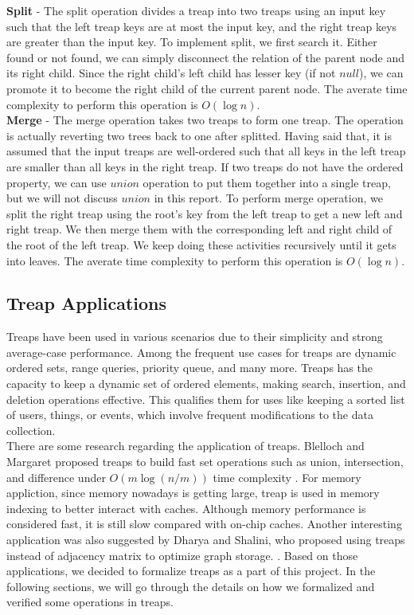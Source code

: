 \noindent \textbf{Split} - The split operation divides a treap into two treaps using an input key such that the left treap keys are at most the input key, and the right treap keys are greater than the input key. To implement split, we first search it. Either found or not found, we can simply disconnect the relation of the parent node and its right child. Since the right child's left child has lesser key (if not $null$), we can promote it to become the right child of the current parent node. The averate time complexity to perform this operation is $O(\log n)$.\\

\noindent \textbf{Merge} - The merge operation takes two treaps to form one treap. The operation is actually reverting two trees back to one after splitted. Having said that, it is assumed that the input treaps are well-ordered such that all keys in the left treap are smaller than all keys in the right treap. If two treaps do not have the ordered property, we can use $union$ operation to put them together into a single treap, but we will not discuss $union$ in this report. To perform merge operation, we split the right treap using the root's key from the left treap to get a new left and right treap. We then merge them with the corresponding left and right child of the root of the left treap. We keep doing these activities recursively until it gets into leaves. The averate time complexity to perform this operation is $O(\log n)$.\\

\subsection{Treap Applications}
Treaps have been used in various scenarios due to their simplicity and strong average-case performance. Among the frequent use cases for treaps are dynamic ordered sets, range queries, priority queue, and many more. Treaps has the capacity to keep a dynamic set of ordered elements, making search, insertion, and deletion operations effective. This qualifies them for uses like keeping a sorted list of users, things, or events, which involve frequent modifications to the data collection. \\

There are some research regarding the application of treaps. Blelloch and Margaret proposed treaps to build fast set operations such as union, intersection, and difference under $O(m \log(n/m))$ time complexity \cite{blelloch1998fast}. For memory appliction, since memory nowadays is getting large, treap is used in memory indexing to better interact with caches. Although memory performance is considered fast, it is still slow compared with on-chip caches. Another interesting application was also suggested by Dharya and Shalini, who proposed using treaps instead of adjacency matrix to optimize graph storage. \cite{arora2012using}. Based on those applications, we decided to formalize treaps as a part of this project. In the following sections, we will go through the details on how we formalized and verified some operations in treaps.\\

